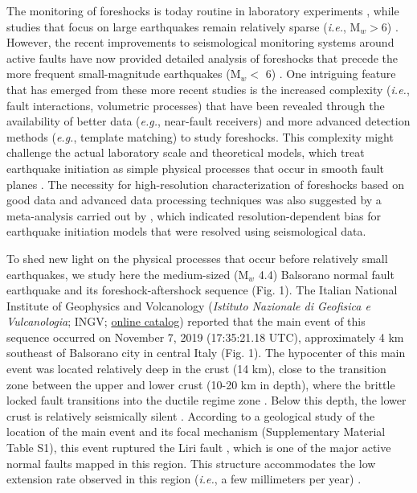 \documentclass[a4paper,12pt,twoside]{article}
\begin{document}
The monitoring of foreshocks is today routine in laboratory experiments \citep[][and references therein]{Zang_1998_SAA, Goebel_2012_IFH, Renard_2019_VSP}, while  studies that focus on large earthquakes remain relatively sparse (\emph{i.e.}, M$_w>$6) \citep[\emph{e.g.},][]{Mogi_1963_SDA, Abercrombie_1996_OPF, Kato_2012_PSS, Chen_2013_CFS, Bouchon_2013_LPP, Ruiz_2014_IFS}. However, the recent improvements to seismological monitoring systems around active faults have now provided detailed analysis of foreshocks that precede the more frequent small-magnitude earthquakes (M$_w <$ 6) \citep[\emph{e.g.},][]{Savage_2017_PPS, Mcmahon_2017_STE, Malin_2018_MPE}. One intriguing feature that has emerged from these more recent studies is the increased complexity (\emph{i.e.}, fault interactions, volumetric processes) that have been revealed through the availability of better data (\emph{e.g.}, near-fault receivers) and more advanced detection methods (\emph{e.g.}, template matching) to study foreshocks. This complexity might challenge the actual laboratory scale and theoretical models, which treat earthquake initiation as simple physical processes that occur in smooth fault planes \citep{Dieterich_1992_ENF, Marone_1998_ELR, Rubin_2005_ENR, Liu_2005_AST}. The necessity for high-resolution characterization of foreshocks based on good data and advanced data processing techniques was also suggested by a meta-analysis carried out by \cite{Mignan_2014_DPV}, which indicated resolution-dependent bias for earthquake initiation models that were resolved using seismological data. 

To shed new light on the physical processes that occur before relatively small earthquakes, we study here the medium-sized (M$_w$ 4.4) Balsorano normal fault earthquake and its foreshock-aftershock sequence (Fig. 1). The Italian National Institute of Geophysics and Volcanology (\emph{Istituto Nazionale di Geofisica e Vulcanologia}; INGV; \href{http://terremoti.ingv.it/it/event/23414191}{\color{blue}online catalog}) reported that the main event of this sequence occurred on November 7, 2019 (17:35:21.18 UTC), approximately 4 km southeast of Balsorano city in central Italy (Fig. 1). The hypocenter of this main event was located relatively deep in the crust (14 km), close to the transition zone between the upper and lower crust (10-20 km in depth), where the brittle locked fault transitions into the ductile regime zone \citep{Doglion_2011_RBD}. Below this depth, the lower crust is relatively seismically silent \citep{Doglion_2011_RBD}. According to a geological study of the location of the main event and its focal mechanism (Supplementary Material Table S1), this event ruptured the Liri fault \citep{Roberts_2004_STV}, which is one of the major active normal faults mapped in this region. This structure accommodates the  low extension rate observed in this region (\emph{i.e.}, a few millimeters per year) \citep{Hunstad_1999_UBR, Westaway_1992_SMS, Dagostino_2001a_ACE, Roberts_2004_STV}.
\end{document}
